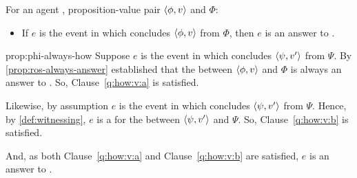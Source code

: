 \begin{note}

  \begin{proposition}
    \label{prop:phi-always-how}
    For an agent \vAgent{}, proposition-value pair \(\langle \phi, v \rangle\) and \poP{} \(\Phi\):

    \begin{itemize}
    \item
      If \(e\) is the event in which \vAgent{} concludes \(\langle \phi, v \rangle\) from \(\Phi\), then \(e\) is an answer to \qHowV{}.
    \end{itemize}
    \vspace{-\baselineskip}
  \end{proposition}

  \begin{argument}{prop:phi-always-how}
    Suppose \(e\) is the event in which \vAgent{} concludes \(\langle \psi, v' \rangle\) from \(\Psi\).
    By \autoref{prop:ros-always-answer} established that the \ros{} between \(\langle \phi, v \rangle\) and \(\Phi\) is always an answer to \qWhyV{}.
    So, Clause~\ref{q:how:v:a} is satisfied.

    Likewise, by assumption \(e\) is the event in which \vAgent{} concludes \(\langle \psi, v' \rangle\) from \(\Psi\).
    Hence, by \autoref{def:witnessing}, \(e\) is a \wit{} for the \ros{} between \(\langle \psi, v' \rangle\) and \(\Psi\).
    So, Clause~\ref{q:how:v:b} is satisfied.

    And, as both Clause~\ref{q:how:v:a} and Clause~\ref{q:how:v:b} are satisfied, \(e\) is an answer to \qHowV{}.
  \end{argument}

\end{note}

